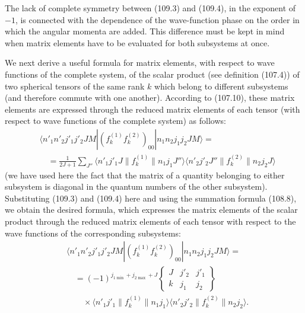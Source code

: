 The lack of complete symmetry between (109.3) and (109.4), in the exponent of $-1$, is connected with the dependence of the wave-function phase on the order in which the angular momenta are added. This difference must be kept in mind when matrix elements have to be evaluated for both subsystems at once.

We next derive a useful formula for matrix elements, with respect to wave functions of the complete system, of the scalar product (see definition (107.4)) of two spherical tensors of the same rank $k$ which belong to different subsystems (and therefore commute with one another). According to (107.10), these matrix elements are expressed through the reduced matrix elements of each tensor (with respect to wave functions of the complete system) as follows:
\[
 \begin{aligned}
 &\langle n'_1n'_2j'_1j'_2JM|(f_k^{(1)}f_k^{(2)})_{00}|n_1n_2j_1j_2JM\rangle={}\\
 &\quad=\frac1{2J+1}\sum_{J''}
 \langle n'_1j'_1J\|f_k^{(1)}\|n_1j_1J''\rangle
 \langle n'_2j'_2J''\|f_k^{(2)}\|n_2j_2J\rangle
 \end{aligned}
\]
(we have used here the fact that the matrix of a quantity belonging to either subsystem is diagonal in the quantum numbers of the other subsystem). Substituting (109.3) and (109.4) here and using the summation formula (108.8), we obtain the desired formula, which expresses the matrix elements of the scalar product through the reduced matrix elements of each tensor with respect to the wave functions of the corresponding subsystems:
\begin{equation}
 \begin{aligned}
 &\langle n'_1n'_2j'_1j'_2JM|(f_k^{(1)}f_k^{(2)})_{00}|n_1n_2j_1j_2JM\rangle={}\\
 &\quad=(-1)^{j_{1\min}+j_{2\max}+J}
 \begin{Bmatrix}J&j'_2&j'_1\\k&j_1&j_2\end{Bmatrix}\\
 &\qquad\times
 \langle n'_1j'_1\|f_k^{(1)}\|n_1j_1\rangle
 \langle n'_2j'_2\|f_k^{(2)}\|n_2j_2\rangle.
 \end{aligned}
 \tag{109.5}
\end{equation}
